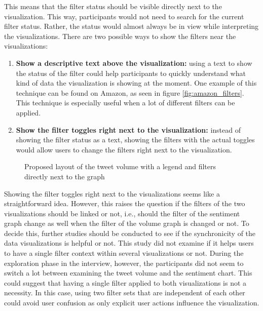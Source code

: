 This means that the filter status should be visible directly next to the visualization. This way, participants would not need to search for the current filter status. Rather, the status would almost always be in view while interpreting the visualizations. There are two possible ways to show the filters near the visualizations:
\begin{enumerate}
    \item \textbf{Show a descriptive text above the visualization:} using a text to show the status of the filter could help participants to quickly understand what kind of data the visualization is showing at the moment. One example of this technique can be found on Amazon, as seen in figure \ref{fig:amazon_filters}. This technique is especially useful when a lot of different filters can be applied.
    \item \textbf{Show the filter toggles right next to the visualization:} instead of showing the filter status as a text, showing the filters with the actual toggles would allow users to change the filters right next to the visualization.
\end{enumerate}

\begin{figure}[h!tbp]
    \caption{Proposed layout of the tweet volume with a legend and filters directly next to the graph}
    \label{fig:legend_and_filters}
\end{figure}

Showing the filter toggles right next to the visualizations seems like a straightforward idea. However, this raises the question if the filters of the two visualizations should be linked or not, i.e., should the filter of the sentiment graph change as well when the filter of the volume graph is changed or not. To decide this, further studies should be conducted to see if the synchronicity of the data visualizations is helpful or not. This study did not examine if it helps users to have a single filter context within several visualizations or not. During the exploration phase in the interview, however, the participants did not seem to switch a lot between examining the tweet volume and the sentiment chart. This could suggest that having a single filter applied to both visualizations is not a necessity. In this case, using two filter sets that are independent of each other could avoid user confusion as only explicit user actions influence the visualization.

